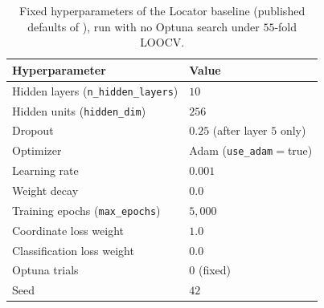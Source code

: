 \documentclass[twocolumn,10pt]{article}
\begin{document}
\begin{table}[t]
\centering
\caption{Fixed hyperparameters of the Locator baseline (published defaults of
\citet{battey2020predicting}), run with no Optuna search under $55$-fold LOOCV.}
\label{tab:locator-defaults}
\begin{tabular}{ll}
\toprule
Hyperparameter & Value \\
\midrule
Hidden layers (\texttt{n\_hidden\_layers}) & $10$ \\
Hidden units (\texttt{hidden\_dim}) & $256$ \\
Dropout & $0.25$ (after layer $5$ only) \\
Optimizer & Adam (\texttt{use\_adam}${}=$true) \\
Learning rate & $0.001$ \\
Weight decay & $0.0$ \\
Training epochs (\texttt{max\_epochs}) & $5{,}000$ \\
Coordinate loss weight & $1.0$ \\
Classification loss weight & $0.0$ \\
Optuna trials & $0$ (fixed) \\
Seed & $42$ \\
\bottomrule
\end{tabular}
\end{table}
\end{document}
